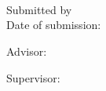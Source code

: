 
\thispagestyle{empty}

\noindent\myTitle{} \\
\noindent\myTitleGerman{} \\
\noindent\myDegree{} \\
\noindent\myThesiscode{}

\bigskip

\noindent Submitted by \myName{} \\
\noindent Date of submission: \myTime{}

\bigskip

\noindent Advisor: \myProf{}

\noindent Supervisor: \mySupervisor{}


\hfill

\vfill

\noindent \myUni{} \\
\noindent \myFaculty{} \\
\noindent \myDepartment{} \\
